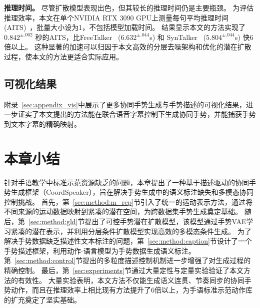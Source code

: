\textbf{推理时间。}
尽管扩散模型表现出色，但其较长的推理时间仍是主要瓶颈。
为评估推理效率，本文在单个NVIDIA RTX 3090 GPU上测量每句平均推理时间(AITS)~\cite{chen2023executing}，批量大小设为1，不包括模型加载时间。
结果显示本文的方法实现了 $0.842^{\pm .002}$ 秒的AITS，比FreeTalker~\cite{yang2024freetalker} ($6.632^{\pm .044}$s) 和 SynTalker~\cite{chen2024syntalker} ($5.804^{\pm .044}$s) 快6倍以上。
这种显著的加速可以归因于本文高效的分层去噪架构和优化的潜在扩散过程，使本文的方法更适合实际应用。

\subsection{可视化结果}
附录~\ref{sec:appendix_vis}中展示了更多协同手势生成与手势描述的可视化结果，进一步证实了本文提出的方法能在联合语音字幕控制下生成协同手势，并能捕获手势到文本字幕的精确映射。





\section{本章小结}
针对手语教学中标准示范资源缺乏的问题，本章提出了一种基于描述驱动的协同手势生成框架（CoordSpeaker），旨在解决手势生成中的语义标注缺失和多模态协同控制挑战。
首先，第~\ref{sec:method:m_rep}节引入了统一的运动表示方法，通过将不同来源的运动数据映射到紧凑的潜在空间，为跨数据集手势生成奠定基础。
随后，第~\ref{sec:method:gld}节提出了可控手势潜在扩散模型，该模型通过手势VAE学习紧凑的潜在表示，并利用分层条件扩散模型实现高效的多模态条件生成。
为了解决手势数据缺乏描述性文本标注的问题，第~\ref{sec:method:caption}节设计了一个手势描述框架，利用动作-语言模型为手势数据生成语义标注。
第~\ref{sec:method:control}节提出的多粒度描述控制机制进一步增强了对生成过程的精确控制。
最后，第~\ref{sec:experiments}节通过大量定性与定量实验验证了本文方法的有效性。
大量实验表明，本文方法不仅能生成语义连贯、节奏同步的协同手势动作，而且在推理效率上相比现有方法提升了6倍以上，为手语标准示范动作库的扩充奠定了坚实基础。
